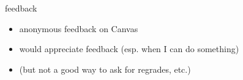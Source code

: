 \begin{frame}{feedback}
    \begin{itemize}
    \item anonymous feedback on Canvas
    \vspace{.5cm}
    \item would appreciate feedback (esp. when I can do something)
    \item (but not a good way to ask for regrades, etc.)
    \end{itemize}
\end{frame}

